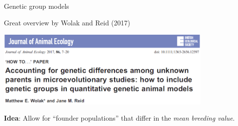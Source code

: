 \documentclass[10pt,ignorenonframetext,]{beamer}
\begin{document}
\begin{frame}

\begin{block}{Genetic group models}

\vspace{3mm}

Great overview by Wolak and Reid (2017)

\vspace{2mm}

\center

\includegraphics[width=0.8\textwidth,height=\textheight]{graphics/wolak_reid.png}

\vspace{3mm}
\vspace{3mm}

\flushleft

\textbf{Idea}: Allow for ``founder populations'' that differ in the
\emph{mean breeding value}.

\end{block}

\end{frame}
\end{document}
